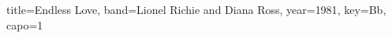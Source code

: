 \documentclass{bekki-leadsheet}
\begin{document}
\begin{song}[transpose-capo=true]{title={Endless Love}, band={Lionel Richie and Diana Ross}, year={1981}, key={Bb}, capo={1}}



\end{song}
\end{document}
